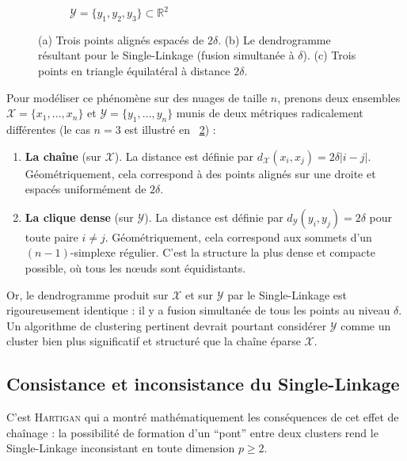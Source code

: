 \begin{figure}[!ht]
\begin{subfigure}[b]{0.3\textwidth}
        \caption{$\mathcal Y = \bigl\{y_1,y_2,y_3\bigl\} \subset \mathbb R^2$\label{fig:triangle_equilateral}}
    \end{subfigure}
    
    \caption{(a) Trois points alignés espacés de $2\delta$. (b) Le dendrogramme résultant pour le Single-Linkage (fusion simultanée à $\delta$). (c) Trois points en triangle équilatéral à distance $2\delta$. %
    }
    \label{fig:chaining_effect}
\end{figure}

Pour modéliser ce phénomène sur des nuages de taille $n$, prenons deux ensembles $\mathcal X = \{x_1, \dots, x_n\}$ et $\mathcal Y = \{y_1, \dots, y_n\}$ munis de deux métriques radicalement différentes (le cas $n=3$ est illustré en \Fig~\ref{fig:chaining_effect}) :
\begin{enumerate}
\item \textbf{La chaîne} (sur $\mathcal X$). La distance est définie par $d_{\mathcal X}(x_i, x_j) = 2\delta|i-j|$. Géométriquement, cela correspond à des points alignés sur une droite et espacés uniformément de $2\delta$.
\item \textbf{La clique dense} (sur $\mathcal Y$). La distance est définie par $d_{\mathcal Y}(y_i,y_j) = 2\delta$ pour toute paire $i \neq j$. Géométriquement, cela correspond aux sommets d'un $(n{-}1)$-simplexe régulier. C'est la structure la plus dense et compacte possible, où tous les nœuds sont équidistants.
\end{enumerate} 

Or, le dendrogramme produit sur $\mathcal{X}$ et sur $\mathcal{Y}$ par le Single-Linkage est rigoureusement identique : il y a fusion simultanée de tous les points au niveau $\delta$. Un algorithme de clustering pertinent devrait pourtant considérer $\mathcal Y$ comme un cluster bien plus significatif et structuré que la chaîne éparse $\mathcal X$.

\subsection{Consistance et inconsistance du Single-Linkage}
C'est \textsc{Hartigan} \cite{hartigan81} qui a montré mathématiquement les conséquences de cet effet de chaînage : la possibilité de formation d'un ``pont'' entre deux clusters rend le Single-Linkage inconsistant en toute dimension $p \ge 2$.

